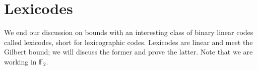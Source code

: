 \documentclass{article}
\numberwithin{theorem}{subsection}
\theoremstyle{definition}
\numberwithin{exmp}{subsection}
\theoremstyle{definition}
\numberwithin{defn}{subsection}
\theoremstyle{definition}
\numberwithin{claim}{subsection}
\begin{document}

\section{Lexicodes}
We end our discussion on bounds with an interesting class of binary linear codes
called lexicodes, short for lexicographic codes.  Lexicodes are linear and meet the Gilbert bound; we will discuss the former and prove the latter.  Note that we are 
working in $\mathbb{F}_2$.
\end{document}
